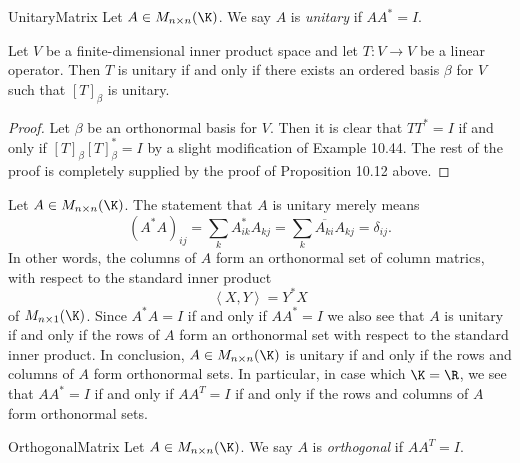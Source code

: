 \documentclass[linearalgebra]{subfiles}
\begin{document}
    \begin{definition}{Unitary}{Matrix}
        Let $A\in M_{n\times n}(\K)$. We say $A$ is \emph{unitary} if $AA^*=I$.
    \end{definition}

    \begin{prop}{}
        Let $V$ be a finite-dimensional inner product space and let $T:V\to V$ be a linear operator. Then $T$ is unitary if and only if there exists an ordered basis $\beta$ for $V$ such that $\left[ T \right] _\beta$ is unitary.
    \end{prop}

    \begin{proof}
        Let $\beta$ be an orthonormal basis for $V$. Then it is clear that $TT^*=I$ if and only if $\left[ T \right] _\beta\left[ T \right] _\beta^* = I$ by a slight modification of Example 10.44. The rest of the proof is completely supplied by the proof of Proposition 10.12 above.
    \end{proof}

    \begin{remark}
        Let $A\in M_{n\times n}(\K)$. The statement that $A$ is unitary merely means
        \begin{equation*}
            \left( A^*A \right) _{ij} = \sum^{}_{k} A^*_{ik}A_{kj} = \sum^{}_{k} \overline{A_{ki}} A_{kj} = \delta_{ij}.
        \end{equation*}
        In other words, the columns of $A$ form an orthonormal set of column matrics, with respect to the standard inner product
        \begin{equation*}
            \left\langle X, Y\right\rangle = Y^*X
        \end{equation*}
        of $M_{n\times 1}(\K)$. Since $A^*A=I$ if and only if $AA^*=I$ we also see that $A$ is unitary if and only if the rows of $A$ form an orthonormal set with respect to the standard inner product. In conclusion, $A\in M_{n\times n}(\K)$ is unitary if and only if the rows and columns of $A$ form orthonormal sets. In particular, in case which $\K=\R$, we see that $AA^*=I$ if and only if $AA^T=I$ if and only if the rows and columns of $A$ form orthonormal sets.
    \end{remark}

    \begin{definition}{Orthogonal}{Matrix}
        Let $A\in M_{n\times n}(\K)$. We say $A$ is \emph{orthogonal} if $AA^T=I$.
    \end{definition}
\end{document}
